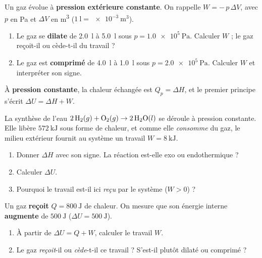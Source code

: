 \documentclass[11pt,a4paper]{article}
\newcommand{\dH}{\Delta H}
\newcommand{\dU}{\Delta U}
\begin{document}
\begin{center}
\end{center}

\begin{exercice}
Un gaz évolue à \textbf{pression extérieure constante}. On rappelle $W = -\,p\,\Delta V$, avec $p$ en
\si{\pascal} et $\Delta V$ en \si{\cubic\metre} ($\SI{1}{\litre}=\SI{e-3}{\cubic\metre}$).
\begin{enumerate}[label=\alph*),leftmargin=2em,topsep=2pt,itemsep=2pt]
  \item Le gaz se \textbf{dilate} de \SI{2.0}{\litre} à \SI{5.0}{\litre} sous $p=\SI{1.0e5}{\pascal}$.
        Calculer $W$ ; le gaz reçoit-il ou cède-t-il du travail ?
  \item Le gaz est \textbf{comprimé} de \SI{4.0}{\litre} à \SI{1.0}{\litre} sous $p=\SI{2.0e5}{\pascal}$.
        Calculer $W$ et interpréter son signe.
\end{enumerate}
\end{exercice}

\begin{exercice}[relier $\dH$, $W$ et $\dU$]
À \textbf{pression constante}, la chaleur échangée est $Q_p=\dH$, et le premier principe s'écrit
$\dU = \dH + W$.

La synthèse de l'eau \;$2\,\ce{H2}(g) + \ce{O2}(g) \rightarrow 2\,\ce{H2O}(l)$\; se déroule à pression
constante. Elle libère $\SI{572}{\kilo\joule}$ sous forme de chaleur, et comme elle \emph{consomme} du
gaz, le milieu extérieur fournit au système un travail $W = \SI{+8}{\kilo\joule}$.
\begin{enumerate}[label=\alph*),leftmargin=2em,topsep=2pt,itemsep=2pt]
  \item Donner $\dH$ avec son signe. La réaction est-elle exo ou endothermique ?
  \item Calculer $\dU$.
  \item Pourquoi le travail est-il ici \emph{reçu} par le système ($W>0$) ?
\end{enumerate}
\end{exercice}

\begin{exercice}
Un gaz \textbf{reçoit} $Q=\SI{800}{\joule}$ de chaleur. On mesure que son énergie interne \textbf{augmente}
de $\SI{500}{\joule}$ ($\dU=\SI{+500}{\joule}$).
\begin{enumerate}[label=\alph*),leftmargin=2em,topsep=2pt,itemsep=2pt]
  \item À partir de $\dU=Q+W$, calculer le travail $W$.
  \item Le gaz \emph{reçoit}-il ou \emph{cède}-t-il ce travail ? S'est-il plutôt dilaté ou comprimé ?
\end{enumerate}
\end{exercice}
\end{document}
